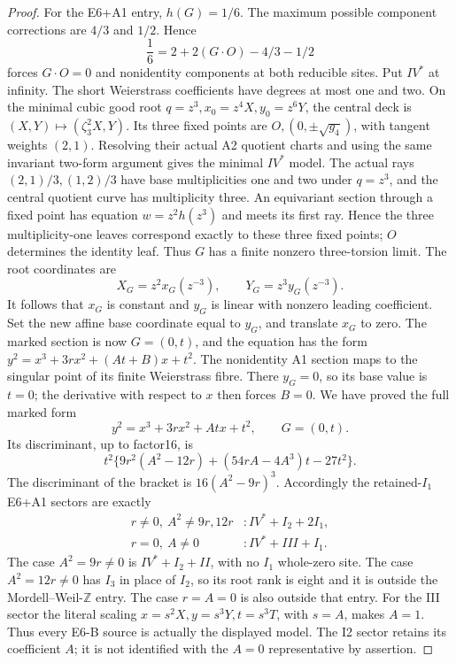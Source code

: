 \begin{proof}
For the E6+A1 entry, \(h(G)=1/6\). The maximum possible
component corrections are \(4/3\) and \(1/2\). Hence
\[
                 \frac16=2+2(G\cdot O)-4/3-1/2
\]
forces \(G\cdot O=0\) and nonidentity components at both
reducible sites. Put \(IV^*\) at infinity. The short
Weierstrass coefficients have degrees at most one and two.
On the minimal cubic good root
\(q=z^3,x_0=z^4X,y_0=z^6Y\), the central deck is
\((X,Y)\mapsto(\zeta_3^2X,Y)\). Its three fixed points are
\(O,(0,\pm\sqrt{g_4})\), with tangent weights \((2,1)\).
Resolving their actual A2 quotient charts and using the
same invariant two-form argument gives the minimal \(IV^*\)
model. The actual rays \((2,1)/3,(1,2)/3\) have base
multiplicities one and two under \(q=z^3\), and the central
quotient curve has multiplicity three. An equivariant section
through a fixed point has equation \(w=z^2h(z^3)\) and meets
its first ray. Hence the three multiplicity-one leaves
correspond exactly to these three fixed points; \(O\) determines
the identity leaf. Thus \(G\) has a finite nonzero three-torsion
limit. The root coordinates are
\[
                 X_G=z^2x_G(z^{-3}),\qquad
                 Y_G=z^3y_G(z^{-3}).
\]
It follows that \(x_G\) is constant and \(y_G\) is linear
with nonzero leading coefficient. Set the new affine base
coordinate equal to \(y_G\), and translate \(x_G\) to zero.
The marked section is now \(G=(0,t)\), and the equation has
the form
\(y^2=x^3+3r x^2+(A t+B)x+t^2\).
The nonidentity A1 section maps to the singular point of
its finite Weierstrass fibre. There \(y_G=0\), so its base
value is \(t=0\); the derivative with respect to \(x\)
then forces \(B=0\). We have proved the full marked form
\[
                   y^2=x^3+3r x^2+A t x+t^2,\qquad G=(0,t).
 \tag{S51.5}
\]
Its discriminant, up to factor16, is
\[
 t^2\{9r^2(A^2-12r)+(54rA-4A^3)t-27t^2\}.
 \tag{S51.6}
\]
The discriminant of the bracket is \(16(A^2-9r)^3\).
Accordingly the retained-\(I_1\) E6+A1 sectors are exactly
\[
 \begin{array}{ll}
 r\ne0,\ A^2\ne9r,12r &: IV^*+I_2+2I_1,\\
 r=0,\ A\ne0 &: IV^*+III+I_1 .
 \end{array}
 \tag{S51.7}
\]
The case \(A^2=9r\ne0\) is \(IV^*+I_2+II\), with no
\(I_1\) whole-zero site. The case \(A^2=12r\ne0\) has
\(I_3\) in place of \(I_2\), so its root rank is eight
and it is outside the Mordell--Weil-\(\mathbb Z\) entry.
The case \(r=A=0\) is also outside that entry.
For the III sector the literal scaling
\(x=s^2X,y=s^3Y,t=s^3T\), with \(s=A\), makes \(A=1\).
Thus every E6-B source is actually the displayed model.
The I2 sector retains its coefficient \(A\); it is not
identified with the \(A=0\) representative by assertion.


\end{proof}
